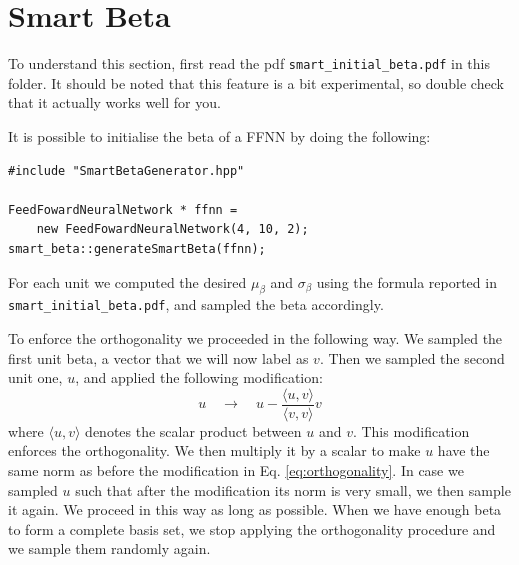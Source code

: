 \documentclass[11pt,a4paper,twoside]{article}
\begin{document}


\section{Smart Beta} %
\label{sec:smart_beta}

To understand this section, first read the pdf \verb+smart_initial_beta.pdf+ in
this folder. It should be noted that this feature is a bit experimental, so
double check that it actually works well for you.

It is possible to initialise the beta of a FFNN by doing the following:
\begin{lstlisting}
#include "SmartBetaGenerator.hpp"

FeedFowardNeuralNetwork * ffnn =
    new FeedFowardNeuralNetwork(4, 10, 2);
smart_beta::generateSmartBeta(ffnn);
\end{lstlisting}

For each unit we computed the desired $\mu_{\beta}$ and $\sigma_{\beta}$ using the formula reported in \verb+smart_initial_beta.pdf+, and sampled the beta accordingly.

To enforce the orthogonality we proceeded in the following way.
We sampled the first unit beta, a vector that we will now label as $v$. Then we sampled the second unit one, $u$, and applied the following modification:
\begin{equation}
   u \quad \rightarrow \quad u - \frac{\langle u, v \rangle}{\langle v, v \rangle} v     \label{eq:orthogonality}
\end{equation}
where $\langle u, v \rangle$ denotes the scalar product between $u$ and $v$.
This modification enforces the orthogonality.
We then multiply it by a scalar to make $u$ have the same norm as before the modification in Eq. \ref{eq:orthogonality}.
In case we sampled $u$ such that after the modification its norm is very small, we then sample it again.
We proceed in this way as long as possible. When we have enough beta to form a complete basis set, we stop applying the orthogonality procedure and we sample them randomly again.

\end{document}
